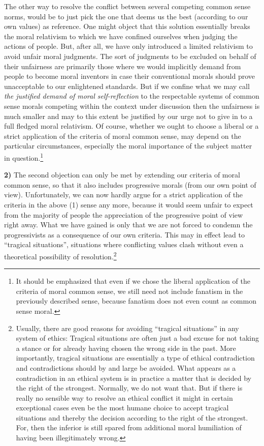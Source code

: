\documentclass[12pt,a4paper,ngerman]{article}
\begin{document}
The other way to resolve the conflict between several competing common sense
norms, would be to just pick the one that deems us the best (according to our
own values) as reference.  One might object that this solution essentially
breaks the moral relativism to which we have confined ourselves when judging
the actions of people. But, after all, we have only introduced a limited
relativism to avoid unfair moral judgments. The sort of judgments to be
excluded on behalf of their unfairness are primarily those where we would
implicitly demand from people to become moral inventors in case their
conventional morals should prove unacceptable to our enlightened standards.
But if we confine what we may call {\em the justified demand of moral
  self-reflection} to the respectable systems of common sense morals competing
within the context under discussion then the unfairness is much smaller and
may to this extent be justified by our urge not to give in to a full fledged
moral relativism. Of course, whether we ought to choose a liberal or a strict
application of the criteria of moral common sense, may depend on the
particular circumstances, especially the moral importance of the subject
matter in question.\footnote{It should be emphasized that even if we chose the
  liberal application of the criteria of moral common sense, we still need not
  include fanatism in the previously described sense, because fanatism does
  not even count as common sense moral.}

{\bf 2)} The second objection can only be met by extending our
criteria of moral common sense, so that it also includes progressive
morals (from our own point of view). Unfortunately, we can now hardly
argue for a strict application of the criteria in the above (1) sense
any more, because it would seem unfair to expect from the majority of
people the appreciation of the progressive point of view right away.
What we have gained is only that we are not forced to condemn the
progressivists as a consequence of our own criteria.  This may in
effect lead to ``tragical situations'', situations where conflicting
values clash without even a theoretical possibility of
resolution.\footnote{Usually, there are good reasons for avoiding
  ``tragical situations'' in any system of ethics: Tragical situations
  are often just a bad excuse for not taking a stance or for already
  having chosen the wrong side in the past. More importantly, tragical
  situations are essentially a type of ethical contradiction and
  contradictions should by and large be avoided. What appears as a
  contradiction in an ethical system is in practice a matter that is
  decided by the right of the strongest.  Normally, we do not want
  that. But if there is really no sensible way to resolve an ethical
  conflict it might in certain exceptional cases even be the most
  humane choice to accept tragical situations and thereby the decision
  according to the right of the strongest.  For, then the inferior is
  still spared from additional moral humiliation of having been
  illegitimately wrong.}
\end{document}
